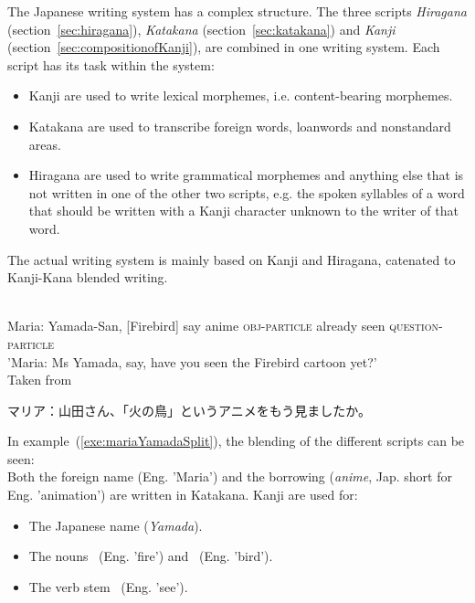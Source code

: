 The Japanese writing system has a complex structure. The three scripts 
\emph{Hiragana} (section~\ref{sec:hiragana}),
\emph{Katakana} (section~\ref{sec:katakana}) and
\emph{Kanji} (section~\ref{sec:compositionofKanji}),
are combined in one writing system. Each script has its task within the system:
\begin{itemize}

  \item Kanji are used to write lexical morphemes, i.e. content-bearing morphemes.

  \item Katakana are used to transcribe foreign words, loanwords and 
        nonstandard areas.

  \item Hiragana are used to write grammatical morphemes and anything else that
        is not written in one of the other two scripts, e.g. the spoken syllables
        of a word that should be written with a Kanji character unknown to the 
        writer of that word.
\end{itemize}
The actual writing system is mainly based on Kanji and Hiragana, catenated to
Kanji-Kana blended writing.
\begin{exe}
\ex\label{exe:mariaYamada}
\begin{xlist}
\ex \label{exe:mariaYamadaSplit}
\gll 
  \\
 Maria: Yamada-San, [Firebird] say anime \textsc{obj-particle} already seen \textsc{question-particle} \\
\trans 'Maria: Ms Yamada, say, have you seen the Firebird cartoon yet?' \\
Taken from~
\ex\label{exe:mariaYamadaFull}
 \begin{CJK} 
  マリア：山田さん、「火の鳥」というアニメをもう見ましたか。
 \end{CJK}
\end{xlist}
\end{exe}
In example~(\ref{exe:mariaYamadaSplit}), the blending of the different scripts 
can be seen:\\
Both the foreign name   (Eng. 'Maria') and the borrowing 
 (\emph{anime}, Jap. short for Eng. 'animation') are written in 
Katakana. Kanji are used for:
\begin{itemize}
\item The Japanese name  (\emph{Yamada}).
\item The nouns ~(Eng. 'fire') and 
      ~(Eng. 'bird').
\item The verb stem ~(Eng. 'see').
\end{itemize}
